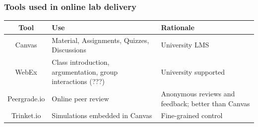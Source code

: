 \documentclass[aspectratio=169]{beamer}
\begin{document}
%
%
%
%
%

\begin{frame}
\frametitle{Tools used in online lab delivery}
\begin{center}
\renewcommand{\arraystretch}{1.5}
\begin{tabular}{cll}
\hline\hline
\textbf{Tool} & \textbf{Use} & \textbf{Rationale} \\
\hline
Canvas & \parbox[t]{2in}{\raggedright Material, Assignments, Quizzes, Discussions }& University LMS\\
WebEx & \parbox[t]{2in}{\raggedright Class introduction, argumentation, group interactions (???)} & University supported\\
Peergrade.io & \parbox[t]{2in}{\raggedright Online peer review} & \parbox[t]{2in}{\raggedright Anonymous reviews and feedback; better than Canvas}\\
Trinket.io & \parbox[t]{2in}{\raggedright Simulations embedded in Canvas} & Fine-grained control\\[3ex]
\hline\hline
\end{tabular}
\end{center}
\end{frame}
\end{document}

